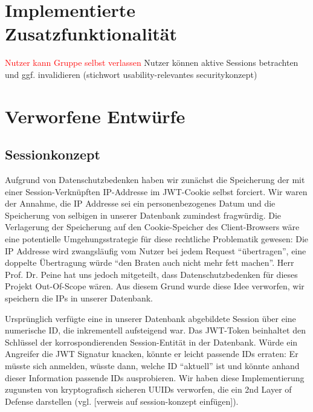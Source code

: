 \documentclass[12pt,DIV14,BCOR10mm,a4paper,parskip=half-,headsepline,headinclude,english,ngerman,bibliography=totocnumbered]{scrreprt}
\begin{document}
\chapter{Implementierte Zusatzfunktionalität}

\textcolor{red}{Nutzer kann Gruppe selbst verlassen}
Nutzer können aktive Sessions betrachten und ggf. invalidieren (stichwort usability-relevantes securitykonzept)

\chapter{Verworfene Entwürfe}

\section{Sessionkonzept}
Aufgrund von Datenschutzbedenken haben wir zunächst die Speicherung der mit einer Session-Verknüpften IP-Addresse im JWT-Cookie selbst forciert. Wir waren der Annahme, die IP Addresse sei ein personenbezogenes Datum und die Speicherung von selbigen in unserer Datenbank zumindest fragwürdig. Die Verlagerung der Speicherung auf den Cookie-Speicher des Client-Browsers wäre eine potentielle Umgehungsstrategie für diese rechtliche Problematik gewesen: Die IP Addresse wird zwangsläufig vom Nutzer bei jedem Request \enquote{übertragen}, eine doppelte Übertragung würde \enquote{den Braten auch nicht mehr fett machen}. Herr Prof. Dr. Peine hat uns jedoch mitgeteilt, dass Datenschutzbedenken für dieses Projekt Out-Of-Scope wären. Aus diesem Grund wurde diese Idee verworfen, wir speichern die IPs in unserer Datenbank.

Ursprünglich verfügte eine in unserer Datenbank abgebildete Session über eine numerische ID, die inkrementell aufsteigend war. Das JWT-Token beinhaltet den Schlüssel der korrospondierenden Session-Entität in der Datenbank. Würde ein Angreifer die JWT Signatur knacken, könnte er leicht passende IDs erraten: Er müsste sich anmelden, wüsste dann, welche ID \enquote{aktuell} ist und könnte anhand dieser Information passende IDs ausprobieren. Wir haben diese Implementierung zugunsten von kryptografisch sicheren UUIDs verworfen, die ein 2nd Layer of Defense darstellen (vgl. [verweis auf session-konzept einfügen]).

\printbibliography

\printacronyms[title=Abkürzungsverzeichnis,toctitle=Abkürzungsverzeichnis]
\printglossary[type=main]

\listoffigures      %

\end{document}
